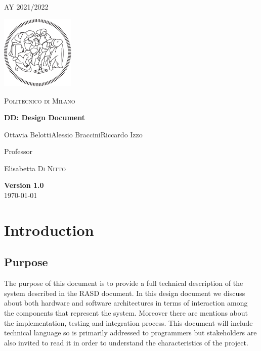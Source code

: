 \documentclass[table, 12pt]{article}
\begin{document}
\begin{titlepage}
    \centering
    {\scshape\large AY 2021/2022 \par}
    \vfill
    \includegraphics[width=100pt]{assets/logo-polimi-new}\par\vspace{1cm}
    {\scshape\LARGE Politecnico di Milano \par}
    \vspace{1.5cm}
    {\huge\bfseries DD\@: Design Document \par}
    \vspace{2cm}
    {\Large {Ottavia Belotti\quad Alessio Braccini\quad Riccardo Izzo}\par}
    \vfill
    {\large Professor\par
        Elisabetta \textsc{Di Nitto}}
    \vfill
    {\large \textbf{Version 1.0}\\ \today \par}
\end{titlepage}


\thispagestyle{plain}
\mbox{}
\newpage
{}
\tableofcontents
\newpage
{}

\section{Introduction}


\subsection{Purpose}
The purpose of this document is to provide a full technical description of the system described in the RASD document.
In this design document we discuss about both hardware and software architectures in terms of interaction among the components that represent the system.
Moreover there are mentions about the implementation, testing and integration process.
This document will include technical language so is primarily addressed to programmers but stakeholders are also invited to read it in order to understand the characteristics of the project.
\end{document}
